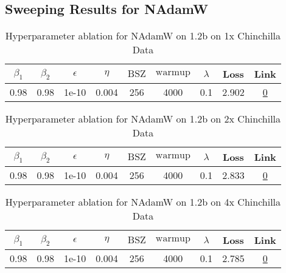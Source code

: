 \subsection{Sweeping Results for NAdamW}%
\begin{table}[H]
\centering
\caption{Hyperparameter ablation for NAdamW on 1.2b on 1x Chinchilla Data}
\label{tab:ablation_nadamw_1.2b_1}
\begin{tabular}{ccccccccc}
\toprule
$\beta_1$ & $\beta_2$ & $\epsilon$ & $\eta$ & $\mathrm{BSZ}$ & $\mathrm{warmup}$ & $\lambda$ & Loss & Link \\
\midrule
0.98 & 0.98 & 1e-10 & 0.004 & 256 & 4000 & 0.1 & 2.902 & \href{https://wandb.ai/stanford-mercury/optimizer-scaling/runs/sweep-1.2b-24B-nadamwf62d1blr0.004-wd0.1-minlr0.0-warmup4000-b10-642070}{0} \\
\midrule
\bottomrule
\end{tabular}
\end{table}

\begin{table}[H]
\centering
\caption{Hyperparameter ablation for NAdamW on 1.2b on 2x Chinchilla Data}
\label{tab:ablation_nadamw_1.2b_2}
\begin{tabular}{ccccccccc}
\toprule
$\beta_1$ & $\beta_2$ & $\epsilon$ & $\eta$ & $\mathrm{BSZ}$ & $\mathrm{warmup}$ & $\lambda$ & Loss & Link \\
\midrule
0.98 & 0.98 & 1e-10 & 0.004 & 256 & 4000 & 0.1 & 2.833 & \href{https://wandb.ai/stanford-mercury/optimizer-scaling/runs/sweep-1.2b-48B-nadamwcb7c09lr0.004-wd0.1-minlr0.0-warmup4000-b10-cf4ac5}{0} \\
\midrule
\bottomrule
\end{tabular}
\end{table}

\begin{table}[H]
\centering
\caption{Hyperparameter ablation for NAdamW on 1.2b on 4x Chinchilla Data}
\label{tab:ablation_nadamw_1.2b_4}
\begin{tabular}{ccccccccc}
\toprule
$\beta_1$ & $\beta_2$ & $\epsilon$ & $\eta$ & $\mathrm{BSZ}$ & $\mathrm{warmup}$ & $\lambda$ & Loss & Link \\
\midrule
0.98 & 0.98 & 1e-10 & 0.004 & 256 & 4000 & 0.1 & 2.785 & \href{https://wandb.ai/stanford-mercury/optimizer-scaling/runs/sweep-1.2b-96B-nadamw8e7088lr0.004-wd0.1-minlr0.0-warmup4000-b10-3c3e6a}{0} \\
\midrule
\bottomrule
\end{tabular}
\end{table}

